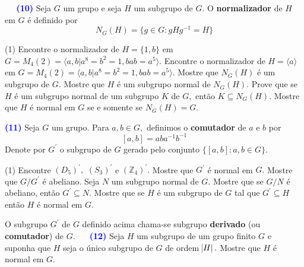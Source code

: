\documentclass[12pt, a4paper]{article}
\newcommand{\negrito}[1]{\mbox{\boldmath{$#1$}}}
\begin{document}
\textcolor{white}{Oi}\newline\newline
\textcolor{blue}{\bf(10)}\label{48} Seja $G$ um grupo e seja $H$ um subgrupo de $G.$ O \textbf{normalizador} de $H$ em $G$ é definido por
\[
N_G(H) = \{g \in G : gHg^{-1} = H \}
\]
\begin{tasks}[counter-format={(tsk[a])},label-width=3.6ex, label-format = {\bfseries}, column-sep = {0pt}](1)
\task[\textcolor{Floresta}{$\negrito{(a)} $}] Encontre o normalizador de $H = \{1, b \}$ em $G = M_4(2) = \langle a,b | a^8 = b^2 = 1, bab = a^5 \rangle.$
\task[\textcolor{Floresta}{$\negrito{(b)} $}] Encontre o normalizador de $H = \langle a \rangle$ em $G = M_4(2) = \langle a,b | a^8 = b^2 = 1, bab = a^5 \rangle.$
\task[\textcolor{Floresta}{$\negrito{(c)} $}] Mostre que $N_G(H)$ é um subgrupo de $G.$ 
\task[\textcolor{Floresta}{$\negrito{(d)} $}] Mostre que $H$ é um subgrupo normal de $N_G(H).$ 
\task[\textcolor{Floresta}{$\negrito{(e)} $}] Prove que se $H$ é um subgrupo normal de um subgrupo $K$ de $G,$ então $K \subseteq N_G(H).$
\task[\textcolor{Floresta}{$\negrito{(f)} $}] Mostre que $H$ é normal em $G$ se e somente se $N_G(H) = G.$
\end{tasks}
\textcolor{blue}{\bf(11)}\label{49} Seja $G$ um grupo. Para $a,b \in G,$ definimos o \textbf{comutador} de $a$ e $b$ por
\[
[a,b] = aba^{-1}b^{-1}
\]
Denote por $G^{\prime}$ o subgrupo de $G$ gerado pelo conjunto $\{[a,b] : a,b \in G \}.$
\begin{tasks}[counter-format={(tsk[a])},label-width=3.6ex, label-format = {\bfseries}, column-sep = {0pt}](1)
\task[\textcolor{Floresta}{$\negrito{(a)} $}] Encontre $(D_5)^{\prime},$ $(S_3)^{\prime}$ e $(\mathbb{Z}_4)^{\prime}.$
\task[\textcolor{Floresta}{$\negrito{(b)} $}] Mostre que $G^{\prime}$ é normal em $G.$
\task[\textcolor{Floresta}{$\negrito{(c)} $}] Mostre que $G/G^{\prime}$ é abeliano.
\task[\textcolor{Floresta}{$\negrito{(d)} $}] Seja $N$ um subgrupo normal de $G.$ Mostre que se $G/N$ é abeliano, então $G^{\prime} \subseteq N.$
\task[\textcolor{Floresta}{$\negrito{(e)} $}] Mostre que se $H$ é um subgrupo de $G$ tal que $G^{\prime} \subseteq H$ então $H$ é normal em $G.$
\end{tasks}
O subgrupo $G^{\prime}$ de $G$ definido acima chama-se subgrupo \textbf{derivado} (ou \textbf{comutador}) de $G.$ 
\textcolor{white}{Oi}\newline\newline
\textcolor{blue}{\bf(12)}\label{50} Seja $H$ um subgrupo de um grupo finito $G$ e suponha que $H$ seja o único subgrupo de $G$ de ordem $\abs{H}.$ Mostre que $H$ é normal em $G.$
\end{document}
